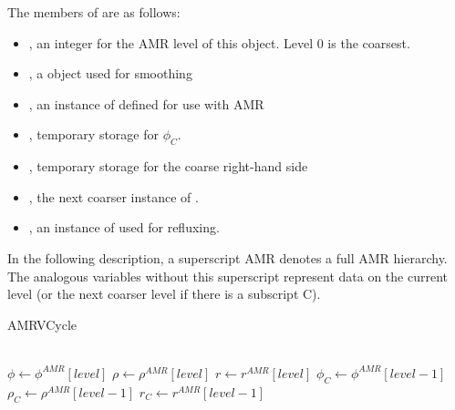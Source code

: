 \documentclass[12pt,a4paper]{article}
\begin{document}
The members of  are as follows:

\begin{itemize}
\item {}, an integer for the AMR level of this object. Level 0 is the coarsest. 
\item {}, a  object used for smoothing
\item {}, an instance of  defined for use with AMR
\item {}, temporary storage for $\phi_C$.
\item {}, temporary storage for the coarse right-hand side
\item {}, the next coarser instance of .
\item {}, an instance of  used for refluxing.  
\end{itemize}

In the following description, a superscript AMR denotes a full AMR hierarchy. The analogous variables without this superscript represent data on the current level (or the next coarser level if there is a subscript C).

\begin{algorithm}
\caption{AMRVCycle}
\begin{algorithmic}[1]
\\
\State $\phi\gets\phi^{AMR}[level]$
\State $\rho\gets\rho^{AMR}[level]$
\State $r \gets r^{AMR}[level]$
\Else
	\State $\phi_C\gets\phi^{AMR}[level-1]$
	\State $\rho_C\gets\rho^{AMR}[level-1]$
    \State $r_C\gets r^{AMR}[level-1]$
	  
	  
	 \EndIf
	  
	  
	 
\EndIf

\EndProcedure
\end{algorithmic}
\end{algorithm}
\end{document}
